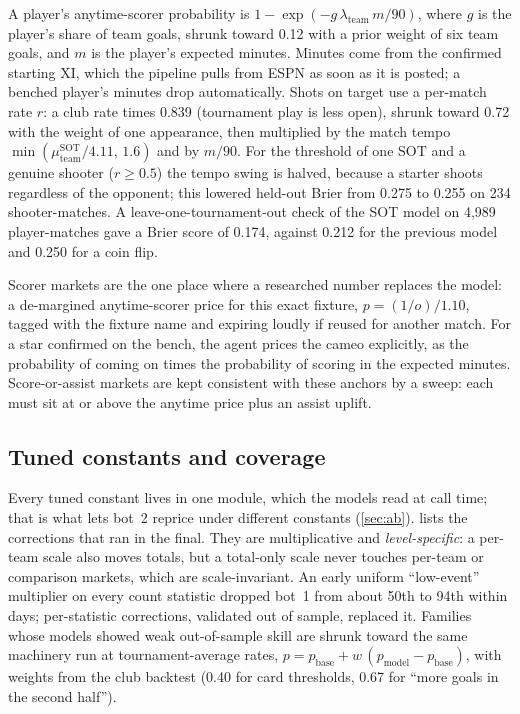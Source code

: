 \documentclass[11pt]{article}
\begin{document}
A player's anytime-scorer probability is $1-\exp(-g\,\lambda_{\text{team}}\,m/90)$, where $g$
is the player's share of team goals, shrunk toward 0.12 with a prior weight of six team goals, and
$m$ is the player's expected minutes. Minutes come from the confirmed starting XI, which the
pipeline pulls from ESPN as soon as it is posted; a benched player's minutes drop
automatically. Shots on target use a per-match rate $r$: a club rate times 0.839 (tournament
play is less open), shrunk toward 0.72 with the weight of one appearance, then multiplied by
the match tempo $\min(\mu^{\text{SOT}}_{\text{team}}/4.11,\,1.6)$ and by $m/90$. For the
threshold of one SOT and a genuine shooter ($r\ge0.5$) the tempo swing is halved, because a
starter shoots regardless of the opponent; this lowered held-out Brier from 0.275 to 0.255 on
234 shooter-matches. A leave-one-tournament-out check of the SOT model on 4,989 player-matches
gave a Brier score of 0.174, against 0.212 for the previous model and 0.250 for a coin flip.

Scorer markets are the one place where a researched number replaces the model: a de-margined
anytime-scorer price for this exact fixture, $p=(1/o)/1.10$, tagged with the fixture name and
expiring loudly if reused for another match. For a star confirmed on the bench, the agent
prices the cameo explicitly, as the probability of coming on times the probability of scoring
in the expected minutes. Score-or-assist markets are kept consistent with these anchors by a
sweep: each must sit at or above the anytime price plus an assist uplift.

\subsection{Tuned constants and coverage}\label{sec:constants}

Every tuned constant lives in one module, which the models read at call time; that is what
lets bot~2 reprice under different constants (\cref{sec:ab}).  lists the
corrections that ran in the final. They are multiplicative and \emph{level-specific}: a
per-team scale also moves totals, but a total-only scale never touches per-team or
comparison markets, which are scale-invariant. An early uniform ``low-event'' multiplier on every
count statistic dropped bot~1 from about 50th to 94th within days; per-statistic corrections,
validated out of sample, replaced it. Families whose models showed weak out-of-sample skill are
shrunk toward the same machinery run at tournament-average rates,
$p=p_{\text{base}}+w\,(p_{\text{model}}-p_{\text{base}})$, with weights from the club backtest
(0.40 for card thresholds, 0.67 for ``more goals in the second half'').
\end{document}
